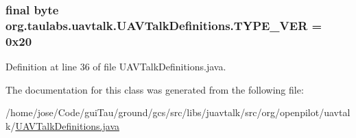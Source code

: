 \hypertarget{classorg_1_1taulabs_1_1uavtalk_1_1_u_a_v_talk_definitions_af6183c1302cd3c3ea3e7a4bb929c73ea}{
\subsubsection[{T\-Y\-P\-E\-\_\-\-V\-E\-R}]{\setlength{\rightskip}{0pt plus 5cm}final byte org.\-taulabs.\-uavtalk.\-U\-A\-V\-Talk\-Definitions.\-T\-Y\-P\-E\-\_\-\-V\-E\-R = 0x20\hspace{0.3cm}{\ttfamily [static]}}}\label{classorg_1_1taulabs_1_1uavtalk_1_1_u_a_v_talk_definitions_af6183c1302cd3c3ea3e7a4bb929c73ea}


Definition at line 36 of file U\-A\-V\-Talk\-Definitions.\-java.



The documentation for this class was generated from the following file\-:\begin{DoxyCompactItemize}
\item 
/home/jose/\-Code/gui\-Tau/ground/gcs/src/libs/juavtalk/src/org/openpilot/uavtalk/\hyperlink{_u_a_v_talk_definitions_8java}{U\-A\-V\-Talk\-Definitions.\-java}\end{DoxyCompactItemize}
